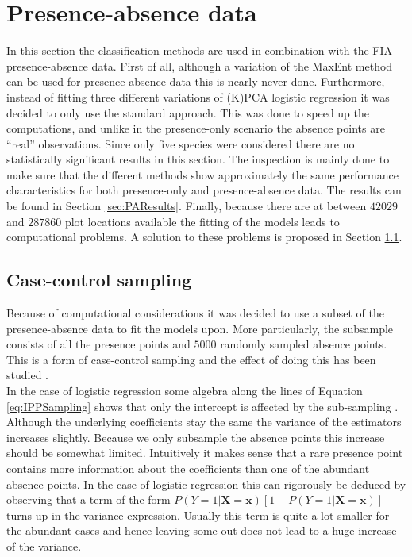 \section{Presence-absence data}
\label{sec:PAData}
In this section the classification methods are used in combination with the FIA presence-absence data. First of all, although a variation of the MaxEnt method can be used for presence-absence data this is nearly never done. Furthermore, instead of fitting three different variations of (K)PCA logistic regression it was decided to only use the standard approach. This was done to speed up the computations, and unlike in the presence-only scenario the absence points are ``real'' observations. Since only five species were considered there are no statistically significant results in this section. The inspection is mainly done to make sure that the different methods show approximately the same performance characteristics for both presence-only and presence-absence data. The results can be found in Section \ref{sec:PAResults}. Finally, because there are at between $42029$ and $287860$ plot locations available the fitting of the models leads to computational problems. A solution to these problems is proposed in Section \ref{sec:CaseControlSubsampling}.
\subsection{Case-control sampling}
\label{sec:CaseControlSubsampling}
Because of computational considerations it was decided to use a subset of the presence-absence data to fit the models upon. More particularly, the subsample consists of all the presence points and $5000$ randomly sampled absence points. This is a form of case-control sampling and the effect of doing this has been studied \parencite{king_logistic_2001}. \\

In the case of logistic regression some algebra along the lines of Equation \ref{eq:IPPSampling} shows that only the intercept is affected by the sub-sampling \parencite{king_logistic_2001}. Although the underlying coefficients stay the same the variance of the estimators increases slightly. Because we only subsample the absence points this increase should be somewhat limited. Intuitively it makes sense that a rare presence point contains more information about the coefficients than one of the abundant absence points. In the case of logistic regression this can rigorously be deduced by observing that a term of the form $P(Y=1|\bm{X} = \bm{x}) \left[1- P(Y=1|\bm{X} = \bm{x}) \right]$ turns up in the variance expression. Usually this term is quite a lot smaller for the abundant cases and hence leaving some out does not lead to a huge increase of the variance. \\ 

